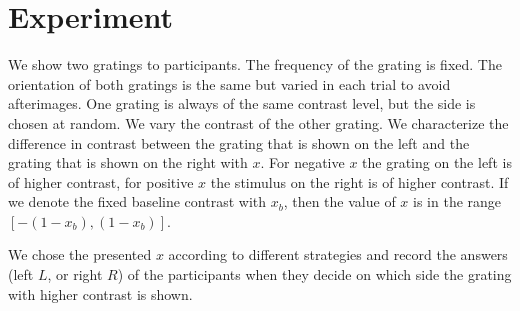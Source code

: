 
\section{Experiment} %
\label{sec:experiment}

We show two gratings to participants. The frequency of the grating is fixed. The orientation of both gratings is the same but varied in each trial to avoid afterimages. One grating is always of the same contrast level, but the side is chosen at random. We vary the contrast of the other grating.
We characterize the difference in contrast between the grating that is shown on the left and the grating that is shown on the right with $x$. For negative $x$ the grating on the left is of higher contrast, for positive $x$ the stimulus on the right is of higher contrast. If we denote the fixed baseline contrast with $x_b$, then the value of $x$ is in the range $[-(1-x_b), (1-x_b)]$.

We chose the presented $x$ according to different strategies and record the answers (left $L$, or right $R$) of the participants when they decide on which side the grating with higher contrast is shown.

